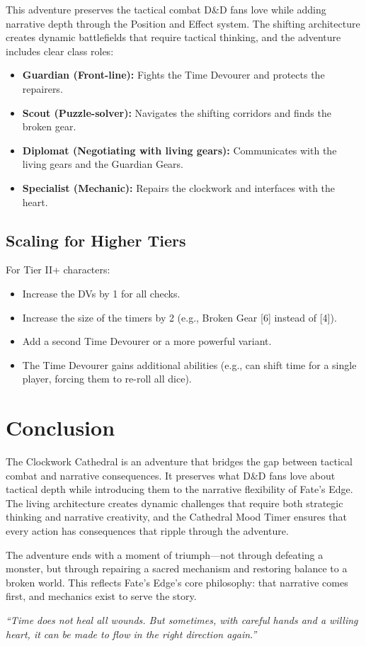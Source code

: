 \documentclass{article}
\begin{document}
This adventure preserves the tactical combat D\&D fans love while adding narrative depth through the Position and Effect system. The shifting architecture creates dynamic battlefields that require tactical thinking, and the adventure includes clear class roles:

\begin{itemize}
    \item \textbf{Guardian (Front-line):} Fights the Time Devourer and protects the repairers.
    \item \textbf{Scout (Puzzle-solver):} Navigates the shifting corridors and finds the broken gear.
    \item \textbf{Diplomat (Negotiating with living gears):} Communicates with the living gears and the Guardian Gears.
    \item \textbf{Specialist (Mechanic):} Repairs the clockwork and interfaces with the heart.
\end{itemize}

\subsection{Scaling for Higher Tiers}

For Tier II+ characters:

\begin{itemize}
    \item Increase the DVs by 1 for all checks.
    \item Increase the size of the timers by 2 (e.g., Broken Gear [6] instead of [4]).
    \item Add a second Time Devourer or a more powerful variant.
    \item The Time Devourer gains additional abilities (e.g., can shift time for a single player, forcing them to re-roll all dice).
\end{itemize}

\section{Conclusion}

The Clockwork Cathedral is an adventure that bridges the gap between tactical combat and narrative consequences. It preserves what D\&D fans love about tactical depth while introducing them to the narrative flexibility of Fate's Edge. The living architecture creates dynamic challenges that require both strategic thinking and narrative creativity, and the Cathedral Mood Timer ensures that every action has consequences that ripple through the adventure.

The adventure ends with a moment of triumph---not through defeating a monster, but through repairing a sacred mechanism and restoring balance to a broken world. This reflects Fate's Edge's core philosophy: that narrative comes first, and mechanics exist to serve the story.

\begin{center}
\textit{``Time does not heal all wounds. But sometimes, with careful hands and a willing heart, it can be made to flow in the right direction again.''}
\end{center}
\end{document}

